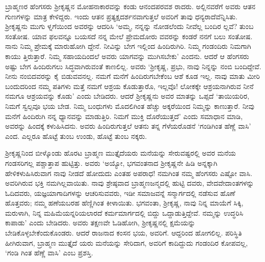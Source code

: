 ಬ್ರಾಹ್ಮಣರ ಹೆಂಗಸರು ಶ್ರೀಕೃಷ್ಣನ ಮೋಹನಾಕಾರವನ್ನು ಕಂಡು ಆನಂದಪರವಶ ರಾದರು. ಅಲ್ಲಿನವರೆಗೆ ಅವರು ಆತನ ಗುಣಗಳನ್ನು ಮಾತ್ರ ಕೇಳಿದ್ದರು. ಇಂದು ಆತನ ಪ್ರತ್ಯಕ್ಷದರ್ಶನವಾಗುತ್ತಲೆ ಅವರಿಗೆ ತಾವು ಧನ್ಯರಾದೆವೆನ್ನಿಸಿತು. ಶ್ರೀಕೃಷ್ಣನು ಮುಗು ಳ್ನಗೆಯಿಂದ ಅವರನ್ನು ಆದರಿಸಿ ‘ಅಮ್ಮ, ನನ್ನನ್ನು ನೋಡಲೆಂದು ನೀವೆಲ್ಲ ಬಂದಿರ ಲ್ಲವೆ? ತುಂಬ ಸಂತೋಷ. ಯಾವ ಫಲವನ್ನೂ ಬಯಸದೆ ನನ್ನ ಮೇಲೆ ಪ್ರೇಮದೋರು ವವರನ್ನು ಕಂಡರೆ ನನಗೆ ಬಲು ಸಂತೋಷ. ನಾನು ನಿಮ್ಮ ಪ್ರೇಮಕ್ಕೆ ಮಾರುಹೋಗಿ ದ್ದೇನೆ. ನೀವಿನ್ನು ಬೇಗ ಇಲ್ಲಿಂದ ಹಿಂದಿರುಗಿರಿ. ನಿಮ್ಮ ಗಂಡಂದಿರು ನಿಮಗಾಗಿ ಕಾಯು ತ್ತಿರುತ್ತಾರೆ. ನಿಮ್ಮ ಸಹಾಯದಿಂದಲೆ ಅವರು ಯಾಗವನ್ನು ಮುಗಿಸಬೇಕು’ ಎಂದನು. ಆದರೆ ಆ ಹೆಂಗಸರು ಅಷ್ಟು ಬೇಗ ಹಿಂದಿರುಗಲು ಸಿದ್ಧವಾಗಿರುವಂತೆ ಕಾಣಲಿಲ್ಲ. ಅವರು ‘ಶ್ರೀಕೃಷ್ಣ, ಪ್ರಭು, ನಾವು ನಿನ್ನನ್ನು ನಂಬಿ ಬಂದಿದ್ದೇವೆ. ನೀನು ನಂಬಿದವರನ್ನು ಕೈ ಬಿಡುವವನಲ್ಲ. ನಮಗೆ ಮನೆಗೆ ಹಿಂದಿರುಗಬೇಕೆಂಬ ಆಶೆ ಕೂಡ ಇಲ್ಲ. ನಾವು ಮಾತು ಮೀರಿ ಬಂದುದರಿಂದ ನಮ್ಮ ಪತಿಗಳು ಮತ್ತೆ ನಮಗೆ ಆಶ್ರಯ ಕೊಡುತ್ತಾರೊ, ಇಲ್ಲವೊ! ಲೋಕಕ್ಕೇ ಆಶ್ರಯನಾಗಿರುವ ನೀನೆ ನಮಗೂ ಆಶ್ರಯವನ್ನು ಕೊಡು’ ಎಂದು ಬೇಡಿದರು. ಆದರೆ ಶ್ರೀಕೃಷ್ಣನು ಅವರ ಮಾತನ್ನು ಒಪ್ಪದೆ ‘ತಾಯಿಯರಿರ, ನಿಮಗೆ ಸ್ವಲ್ಪವೂ ಭಯ ಬೇಡ. ನಿಮ್ಮ ಬಂಧುಗಳು ಮೊದಲಿಗಿಂತ ಹೆಚ್ಚು ಅಕ್ಕರೆಯಿಂದ ನಿಮ್ಮನ್ನು ಕಾಣುತ್ತಾರೆ. ನೀವು ಮನೆಗೆ ಹಿಂದಿರುಗಿ ನನ್ನ ಧ್ಯಾನವನ್ನು ಮಾಡುತ್ತಿರಿ. ನಿಮಗೆ ಮುಕ್ತಿ ದೊರೆಯುತ್ತದೆ’ ಎಂದು ಸಮಾಧಾನ ಮಾಡಿ, ಅವರನ್ನು ಹಿಂದಕ್ಕೆ ಕಳುಹಿಸಿದನು. ಅವರು ಹಿಂದಿರುಗುತ್ತಲೆ ಆತನು ತನ್ನ ಗೆಳೆಯರೊಡನೆ ‘ಗಂಡಿಗಿಂತ ಹೆಣ್ಣೆ ವಾಸಿ’ ಎಂದ. ಎಲ್ಲರೂ ಹೊಟ್ಟೆ ತುಂಬ ಉಂಡು, ಹೊಟ್ಟೆ ತುಂಬ ನಕ್ಕರು.

ಶ್ರೀಕೃಷ್ಣನಿಂದ ಬೀಳ್ಕೊಂಡು ಹೊರಟ ಬ್ರಾಹ್ಮಣ ಮುತ್ತೈದೆಯರು ಮನೆಯನ್ನು ಸೇರುವಷ್ಟರಲ್ಲಿ ಅವರ ಮನೆಯ ಗಂಡಸರಿಗಲ್ಲ ಪಶ್ಚಾತ್ತಾಪ ಹುಟ್ಟಿತ್ತು. ಅವರು ‘ಅಯ್ಯೋ, ಭಗವಂತನಾದ ಶ್ರೀಕೃಷ್ಣನೇ ಹಿಡಿ ಅನ್ನಕ್ಕಾಗಿ ಹೇಳಿಕಳುಹಿಸಿರುವಾಗ ನಾವು ನೀಡದೆ ಹೋದುದು ಎಂತಹ ಅಪರಾಧ! ನಮಗಿಂತ ನಮ್ಮ ಹೆಂಗಸರು ಎಷ್ಟೋ ವಾಸಿ. ಅವರಿಗಿರುವ ಭಕ್ತಿ ನಮಗಿಲ್ಲವಾಯಿತು. ನಾವು ಶ್ರೇಷ್ಠವಾದ ಬ್ರಾಹ್ಮಣಜನ್ಮದಲ್ಲಿ ಹುಟ್ಟಿ ದವರು, ವೇದವೇದಾಂತಗಳನ್ನು ಓದಿದವರು, ಯಜ್ಞಯಾಗಾದಿಗಳನ್ನು ಆಚರಿಸುವವರು, ಇಡೀ ಸಮಾಜವನ್ನೆ ಸನ್ಮಾರ್ಗದಲ್ಲಿ ನಡೆಸುವ ಹೊಣೆ ಹೊತ್ತವರು; ನಮ್ಮ ಹಣೆಯಬರಹ ಹೆಣ್ಣಿಗಿಂತ ಕೀಳಾಯಿತು. ಭಗವಂತಾ, ಶ್ರೀಕೃಷ್ಣ, ನಾವು ನಿನ್ನ ಮಾಯೆಗೆ ಸಿಕ್ಕಿ, ಮರುಳಾಗಿ, ನಿನ್ನ ಮಹಿಮೆಯನ್ನರಿಯಲಾರದೆ ಕರ್ಮಮಾರ್ಗದಲ್ಲಿ ಬಿದ್ದು ಒದ್ದಾಡುತ್ತಿದ್ದೇವೆ. ನಮ್ಮನ್ನು ಉದ್ಧರಿಸಿ ಕಾಪಾಡು’ ಎಂದು ಬೇಡಿದರು. ಅವರು ತಕ್ಷಣವೇ ಓಡಿಹೋಗಿ, ಶ್ರೀಕೃಷ್ಣನಲ್ಲಿ ಕ್ಷಮೆಯನ್ನು ಬೇಡಿಕೊಳ್ಳಬೇಕೆಂದುಕೊಂಡರು. ಆದರೆ ರಾಜನಾದ ಕಂಸನ ಭಯ, ಅವರಿಗೆ. ಆದ್ದರಿಂದ ಹೋಗಲಿಲ್ಲ. ಪರಿಸ್ಥಿತಿ ಹೀಗಿರುವಾಗ, ಬ್ರಾಹ್ಮಣ ಮುತ್ತೈದೆ ಯರು ಮನೆಯನ್ನು ಸೇರಿದಾಗ, ಅವರಿಗೆ ಕಾದಿದ್ದುದು ಗಂಡಂದಿರ ಕೋಪವಲ್ಲ, ‘ಗಂಡಿ ಗಿಂತ ಹೆಣ್ಣೆ ವಾಸಿ’ ಎಂಬ ಪ್ರಶಸ್ತಿ.

